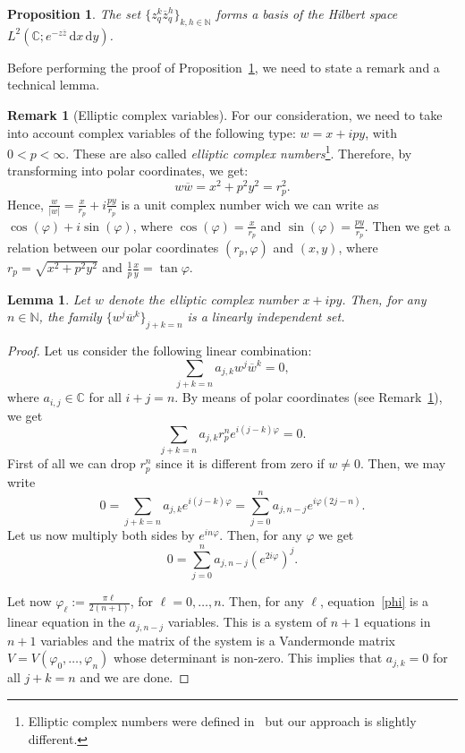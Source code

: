 \documentclass[10pt]{amsart}
\theoremstyle{plain}
\newtheorem{proposition}[theorem]{Proposition}
\newtheorem{lemma}[theorem]{Lemma}
\theoremstyle{definition}
\newtheorem{remark}[theorem]{Remark}
\renewcommand{\bar}[1]{\overline{#1}}
\begin{document}
\begin{proposition}\label{propbasis}
The set $ \{z_q^k \bar{z}_q^h\}_{k,h \in \mathbb{N}} $ forms a basis of the Hilbert space $ L^2(\mathbb{C}; e^{-z\bar z} \, \mathrm{d}x\,\mathrm{d}y) $.
\end{proposition}

Before performing the proof of Proposition~\ref{propbasis}, we need to state a remark and a technical lemma.
\begin{remark}[Elliptic complex variables]\label{elliptic}
For our consideration, we need to take into account complex variables of the following type:
$w=x+ipy$, with $0<p<\infty$. 
These are also called \textit{elliptic complex numbers}\footnote{Elliptic complex numbers were defined in~\cite{harkin} but our approach is slightly different.}.
Therefore, by transforming into polar coordinates, we get:
\[w\bar w=x^{2}+p^{2}y^{2}=r_{p}^{2}.\]
Hence, $\frac{w}{|w|}=\frac{x}{r_{p}}+i\frac{py}{r_{p}}$ is a unit complex number wich we
can write as $\cos(\varphi)+i\sin(\varphi)$, where $\cos(\varphi)=\frac{x}{r_{p}}$
and $\sin(\varphi)=\frac{py}{r_{p}}$. Then we get a relation between our polar coordinates $(r_{p},\varphi)$ and $(x,y)$, where $r_{p}=\sqrt{x^{2}+p^{2}y^{2}}$ and $\frac{1}{p}\frac{x}{y}=\tan\varphi$.
\end{remark}

\begin{lemma}\label{lemmaelliptic}
Let $w$ denote the elliptic complex number $x+ipy$. Then, for any $n\in\mathbb{N}$,
the family $\{w^{j}\bar w^{k}\}_{j+k=n}$ is a linearly independent set. 
\end{lemma}

\begin{proof}
Let us consider the following linear combination:
\[\sum_{j+k=n}a_{j,k}w^{j}\bar w^{k}=0,\]
where $a_{i,j}\in\mathbb{C}$ for all $i+j=n$.
By means of polar coordinates (see Remark~\ref{elliptic}), we get 
\[\sum_{j+k=n}a_{j,k}r_{p}^{n}e^{i(j-k)\varphi}=0.\]
First of all we can drop $r_{p}^{n}$ since it is different from zero if $w\neq 0$.
Then, we may write
\[0=\sum_{j+k=n}a_{j,k}e^{i(j-k)\varphi}=\sum_{j=0}^{n}a_{j,n-j}e^{i\varphi(2j-n)}.\]
Let us now multiply both sides by $e^{in\varphi}$. Then, for any $\varphi$ we get
\begin{equation}\label{phi}
0=\sum_{j=0}^{n}a_{j,n-j}(e^{2i\varphi})^{j}.
\end{equation}

Let now $\varphi_{\ell}:=\frac{\pi\ell}{2(n+1)}$, for $\ell=0,\dots,n$. Then, for any
$\ell$, equation~\eqref{phi} is a linear equation in the $a_{j,n-j}$ variables.
This is a system of $n+1$ equations in $n+1$ variables and the matrix of the system is a Vandermonde matrix $V=V(\varphi_{0},\dots,\varphi_{n})$ whose determinant is non-zero.
This implies that $a_{j,k}=0$ for all $j+k=n$ and we are done.
\end{proof}
\end{document}
